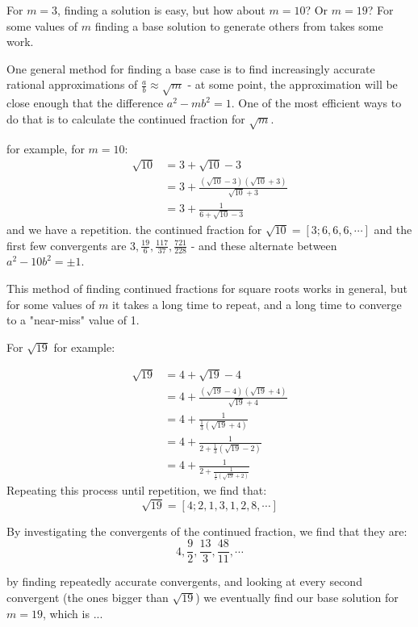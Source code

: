 \documentclass{article}
\begin{document}
For $m=3$, finding a solution is easy, but how about $m=10$? Or $m=19$? For some values of $m$ finding a base solution to generate others from takes some work.

One general method for finding a base case is to find increasingly accurate rational approximations of $\frac{a}{b} \approx \sqrt{m}$ - at some point, the approximation will be close enough that the difference $ a^2-mb^2 = 1$. One of the most efficient ways to do that is to calculate the continued fraction for $\sqrt{m}$.

for example, for $m=10$:
\begin{align*}
    \sqrt{10} &= 3+\sqrt{10}-3 \\
    &= 3+\frac{(\sqrt{10}-3)(\sqrt{10}+3)}{\sqrt{10}+3} \\
    &= 3 + \frac{1}{6+\sqrt{10}-3}
\end{align*}
and we have a repetition. the continued fraction for $\sqrt{10} = [3;6,6,6,\cdots]$ and the first few convergents are $3,\frac{19}{6},\frac{117}{37}, \frac{721}{228}$ - and these alternate between $a^2-10b^2=\pm1$.

This method of finding continued fractions for square roots works in general, but for some values of $m$ it takes a long time to repeat, and a long time to converge to a "near-miss" value of 1.

For $\sqrt{19}$ for example:

\begin{align*}
    \sqrt{19} &= 4 + \sqrt{19} -4 \\
    &= 4 + \frac{(\sqrt{19}-4)(\sqrt{19}+4)}{\sqrt{19}+4} \\
    &= 4 + \frac{1}{\frac{1}{3}(\sqrt{19}+4)} \\
    &= 4 + \frac{1}{2 + \frac{1}{3}(\sqrt{19} - 2) } \\
    &= 4 + \frac{1}{2 + \frac{1}{\frac{1}{5}(\sqrt{19} + 2)}}
\end{align*}
Repeating this process until repetition, we find that:
\[ \sqrt{19} = [4;2,1,3,1,2,8,\cdots] \]

By investigating the convergents of the continued fraction, we find that they are:
\[ 4,\frac{9}{2},\frac{13}{3}, \frac{48}{11}, \cdots \]

by finding repeatedly accurate convergents, and looking at every second convergent (the ones bigger than $ \sqrt{19}$) we eventually find our base solution for $m=19$, which is ...
\end{document}
